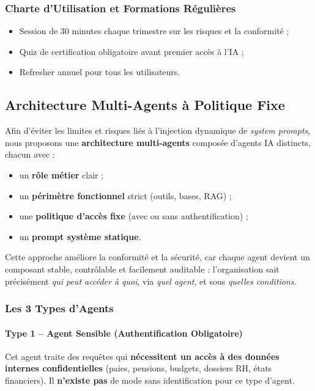 \documentclass[12pt, a4paper]{report}
\begin{document}
\subsubsection{Charte d'Utilisation et Formations Régulières}

\begin{itemize}
  \item Session de 30 minutes chaque trimestre sur les risques et la
        conformité ;
  \item Quiz de certification obligatoire avant premier accès à l'IA ;
  \item Refresher annuel pour tous les utilisateurs.
\end{itemize}

\subsection{Architecture Multi-Agents à Politique Fixe}

Afin d'éviter les limites et risques liés à l'injection dynamique de
\textit{system prompts}, nous proposons une \textbf{architecture
multi-agents} composée d'agents IA distincts, chacun avec :

\begin{itemize}
  \item un \textbf{rôle métier} clair ;
  \item un \textbf{périmètre fonctionnel} strict (outils, bases, RAG) ;
  \item une \textbf{politique d'accès fixe} (avec ou sans
        authentification) ;
  \item un \textbf{prompt système statique}.
\end{itemize}

Cette approche améliore la conformité et la sécurité, car chaque agent
devient un composant stable, contrôlable et facilement auditable :
l'organisation sait précisément \textit{qui peut accéder à quoi}, via
\textit{quel agent}, et sous \textit{quelles conditions}.

\subsubsection{Les 3 Types d'Agents}

\paragraph{Type 1 -- Agent Sensible (Authentification Obligatoire)}
Cet agent traite des requêtes qui \textbf{nécessitent un accès à des
données internes confidentielles} (paies, pensions, budgets, dossiers RH,
états financiers). Il \textbf{n'existe pas} de mode sans identification
pour ce type d'agent.
\end{document}
